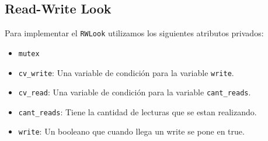 \documentclass[hidelinks,a4paper,12pt, nofootinbib]{article}
\begin{document}
\maketitle
\tableofcontents
\newpage

\subsection{Read-Write Look}
Para implementar el \texttt{RWLook} utilizamos los siguientes atributos privados:
\begin{itemize}
	\item \texttt{mutex}
	\item \texttt{cv\_write}: Una variable de condición para la variable \texttt{write}. 
	\item \texttt{cv\_read}: Una variable de condición para la variable \texttt{cant\_reads}.
	\item \texttt{cant\_reads}: Tiene la cantidad de lecturas que se estan realizando.
	\item \texttt{write}: Un booleano que cuando llega un write se pone en true.
\end{itemize}
\end{document}
